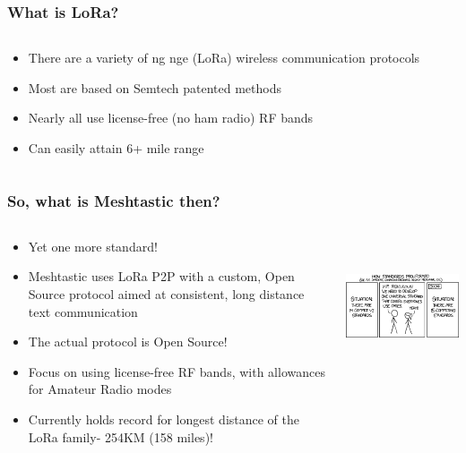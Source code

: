\documentclass[aspectratio=169]{beamer}
\begin{document}
\begin{frame}[fragile]
  \frametitle{What is LoRa?}
  \begin{columns}[]
    \begin{column}[T]{0.45\paperwidth}
      \begin{itemize}%
        \item{There are a variety of \color{red}{Lo}\color{black}ng \color{red}{Ra}\color{black}nge (LoRa) wireless communication protocols}
        \item{Most are based on Semtech patented methods}
        \item{Nearly all use license-free (no ham radio) RF bands}
        \item{Can easily attain 6+ mile range}
     \end{itemize}
    \end{column}
    \begin{column}[T]{0.45\paperwidth}
    \end{column}
  \end{columns}
\end{frame}

\begin{frame}[fragile]
  \frametitle{So, what is Meshtastic then?}
  \begin{columns}[]
    \begin{column}[T]{0.45\paperwidth}
      \begin{itemize}%
        \item{Yet one more standard!}
        \item{Meshtastic uses LoRa P2P with a custom, Open Source protocol aimed at consistent, long distance text communication}
        \item{The actual protocol is Open Source!}
        \item{Focus on using license-free RF bands, with allowances for Amateur Radio modes}
        \item{Currently holds record for longest distance of the LoRa family- 254KM (158 miles)!}
     \end{itemize}
    \end{column}
    \begin{column}[T]{0.45\paperwidth}
      \includegraphics[height=4cm,keepaspectratio]{images/standards.png}
    \end{column}
  \end{columns}
\end{frame}
\end{document}
